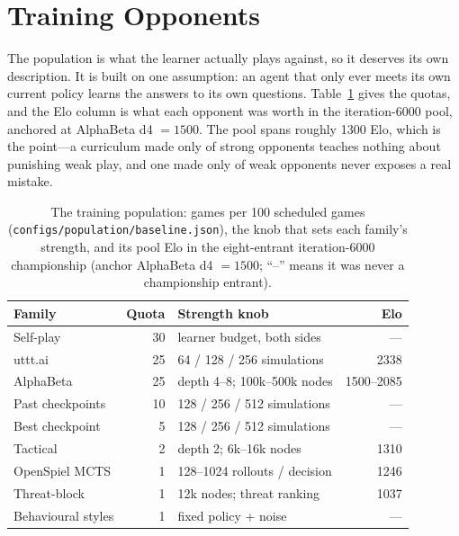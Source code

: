 \documentclass[conference]{IEEEtran}
\newcommand{\code}[1]{\texttt{#1}}
\newcommand{\utttai}{uttt.ai}
\begin{document}
\section{Training Opponents}
\label{sec:opponents}

The population is what the learner actually plays against, so it deserves
its own description. It is built on one assumption: an agent that only ever
meets its own current policy learns the answers to its own questions.
Table~\ref{tab:population} gives the quotas, and the Elo column is what each
opponent was worth in the iteration-6000 pool, anchored at AlphaBeta d4
$=1500$. The pool spans roughly 1300 Elo, which is the point---a curriculum
made only of strong opponents teaches nothing about punishing weak play, and
one made only of weak opponents never exposes a real mistake.

\begin{table}[t]
  \centering\footnotesize
  \caption{The training population: games per 100 scheduled games
  (\code{configs/population/baseline.json}), the knob that sets each
  family's strength, and its pool Elo in the eight-entrant iteration-6000
  championship (anchor AlphaBeta d4 $=1500$; ``--'' means it was never a
  championship entrant).}
  \label{tab:population}
  \setlength{\tabcolsep}{3pt}
  \begin{tabular}{@{}lrlr@{}}
    \toprule
    Family & Quota & Strength knob & Elo \\
    \midrule
    Self-play & 30 & learner budget, both sides & --- \\
    \utttai\ & 25 & 64 / 128 / 256 simulations & 2338 \\
    AlphaBeta & 25 & depth 4--8; 100k--500k nodes & 1500--2085 \\
    Past checkpoints & 10 & 128 / 256 / 512 simulations & --- \\
    Best checkpoint & 5 & 128 / 256 / 512 simulations & --- \\
    Tactical & 2 & depth 2; 6k--16k nodes & 1310 \\
    OpenSpiel MCTS & 1 & 128--1024 rollouts / decision & 1246 \\
    Threat-block & 1 & 12k nodes; threat ranking & 1037 \\
    Behavioural styles & 1 & fixed policy + noise & --- \\
    \bottomrule
  \end{tabular}
\end{table}
\end{document}
